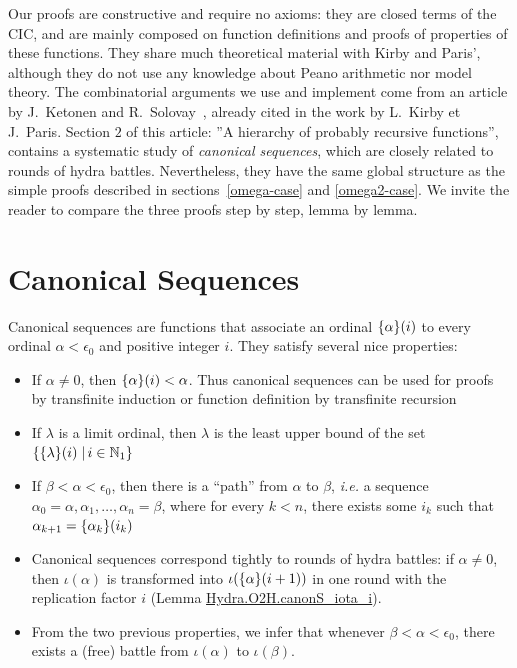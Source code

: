 Our proofs are  constructive and require no axioms: they are  closed terms of the CIC, and are mainly composed on function definitions and proofs of properties of these functions. 
They  share much theoretical material with Kirby and Paris', although they do not use any knowledge about Peano arithmetic nor model  theory.  The combinatorial arguments we use and implement
come from 
 an article by J.~Ketonen and R.~Solovay~\cite{KS81}, already  cited in the work
 by L.~Kirby et J.~Paris.%
 Section $2$ of this article: ''A hierarchy of probably recursive functions'', contains a systematic study of \emph{canonical sequences}, which are closely related to
rounds of hydra battles. 
Nevertheless, they have the same global structure as the simple proofs described in
sections~\vref{omega-case} and \vref{omega2-case}. 
We invite the reader to compare the three proofs step by step, lemma by lemma.

\section{Canonical Sequences}
\label{ketonen-solovay-sect}

Canonical sequences are functions that associate an ordinal $\mbox{$\{\alpha\}(i)$}$ to every ordinal $\alpha<\epsilon_0$ and positive integer $i$. They satisfy several nice properties:

\begin{itemize}
\item If $\alpha\not=0$, then $\mbox{$\{\alpha\}(i)$}<\alpha$. Thus canonical sequences can be used for proofs by transfinite induction or function definition by transfinite recursion
\item If $\lambda$ is a limit ordinal, then $\lambda$ is the least upper bound of the set 
$\{\mbox{$\{\lambda\}(i)$}\;|\,i\in\mathbb{N}_1\}$


\item If $\beta<\alpha<\epsilon_0$, then there is a ``path'' from $\alpha$ to $\beta$, \emph{i.e.} a
sequence $\alpha_0=\alpha, \alpha_1, \dots, \alpha_n=\beta$, where for every $k<n$, there exists some $i_k$ such that $\alpha_{k+1}=\mbox{$\{\alpha_k\}(i_k)$}$
\item Canonical sequences correspond tightly to rounds of hydra battles: if $\alpha\not=0$,
then $\iota(\alpha)$ is transformed into $\iota(\mbox{$\{\alpha\}(i+1)$})$ in one round with
the replication factor $i$ (Lemma \href{../theories/html/hydras.Hydra.O2H.html\#canonS_iota_i}{Hydra.O2H.canonS\_iota\_i}).
\item From the two previous properties, we infer that whenever $\beta<\alpha<\epsilon_0$, there exists a (free) battle from $\iota(\alpha)$ to $\iota(\beta)$.
\end{itemize}

